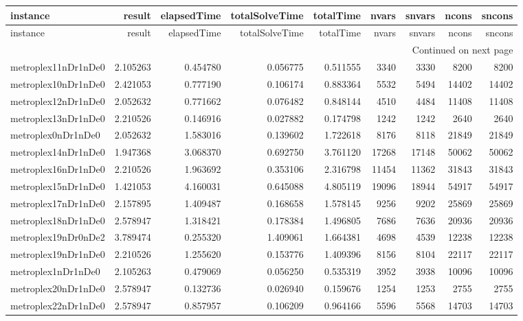 
\begin{longtable}{|l|r|r|r|r|r|r|r|r|}
\toprule
instance & result & elapsedTime & totalSolveTime & totalTime & nvars & snvars & ncons & sncons \\
\midrule
\endfirsthead
\toprule
instance & result & elapsedTime & totalSolveTime & totalTime & nvars & snvars & ncons & sncons \\
\midrule
\endhead
\midrule
\multicolumn{9}{r}{Continued on next page} \\
\midrule
\endfoot
\bottomrule
\endlastfoot
metroplex11nDr1nDe0 & 2.105263 & 0.454780 & 0.056775 & 0.511555 & 3340 & 3330 & 8200 & 8200 \\
metroplex10nDr1nDe0 & 2.421053 & 0.777190 & 0.106174 & 0.883364 & 5532 & 5494 & 14402 & 14402 \\
metroplex12nDr1nDe0 & 2.052632 & 0.771662 & 0.076482 & 0.848144 & 4510 & 4484 & 11408 & 11408 \\
metroplex13nDr1nDe0 & 2.210526 & 0.146916 & 0.027882 & 0.174798 & 1242 & 1242 & 2640 & 2640 \\
metroplex0nDr1nDe0 & 2.052632 & 1.583016 & 0.139602 & 1.722618 & 8176 & 8118 & 21849 & 21849 \\
metroplex14nDr1nDe0 & 1.947368 & 3.068370 & 0.692750 & 3.761120 & 17268 & 17148 & 50062 & 50062 \\
metroplex16nDr1nDe0 & 2.210526 & 1.963692 & 0.353106 & 2.316798 & 11454 & 11362 & 31843 & 31843 \\
metroplex15nDr1nDe0 & 1.421053 & 4.160031 & 0.645088 & 4.805119 & 19096 & 18944 & 54917 & 54917 \\
metroplex17nDr1nDe0 & 2.157895 & 1.409487 & 0.168658 & 1.578145 & 9256 & 9202 & 25869 & 25869 \\
metroplex18nDr1nDe0 & 2.578947 & 1.318421 & 0.178384 & 1.496805 & 7686 & 7636 & 20936 & 20936 \\
metroplex19nDr0nDe2 & 3.789474 & 0.255320 & 1.409061 & 1.664381 & 4698 & 4539 & 12238 & 12238 \\
metroplex19nDr1nDe0 & 2.210526 & 1.255620 & 0.153776 & 1.409396 & 8156 & 8104 & 22117 & 22117 \\
metroplex1nDr1nDe0 & 2.105263 & 0.479069 & 0.056250 & 0.535319 & 3952 & 3938 & 10096 & 10096 \\
metroplex20nDr1nDe0 & 2.578947 & 0.132736 & 0.026940 & 0.159676 & 1254 & 1253 & 2755 & 2755 \\
metroplex22nDr1nDe0 & 2.578947 & 0.857957 & 0.106209 & 0.964166 & 5596 & 5568 & 14703 & 14703 \\

\end{longtable}
